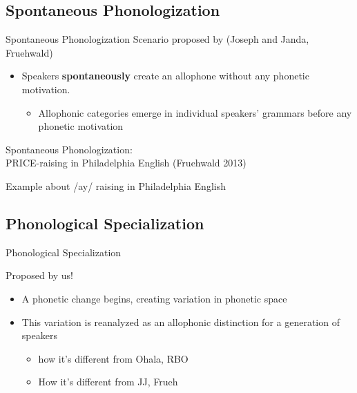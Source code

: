 \documentclass[hyperref={pdfpagelabels=false}]{beamer}
\begin{document}
\subsection{Spontaneous Phonologization}

\begin{frame}{Spontaneous Phonologization}
	Scenario proposed by (Joseph and Janda, Fruehwald) 
	
	\begin{itemize}
		\item Speakers \textbf{spontaneously} create an allophone without any phonetic motivation.  \\
		\begin{itemize}
			\item Allophonic categories emerge in individual speakers' grammars before any phonetic motivation
		\end{itemize}
	\end{itemize}

\end{frame}

\begin{frame}{Spontaneous Phonologization: \\ \small{PRICE-raising in Philadelphia English (Fruehwald 2013)}}

	Example about /ay/ raising in Philadelphia English

\end{frame}

\subsection{Phonological Specialization}

\begin{frame}{Phonological Specialization}

	Proposed by us!
	\begin{itemize}
		\item A phonetic change begins, creating variation in phonetic space
		\item This variation is reanalyzed as an allophonic distinction for a generation of speakers
		\begin{itemize}
				\item how it's different from Ohala, RBO
				\item How it's different from JJ, Frueh
		\end{itemize}
	\end{itemize}

\end{frame}
\end{document}
